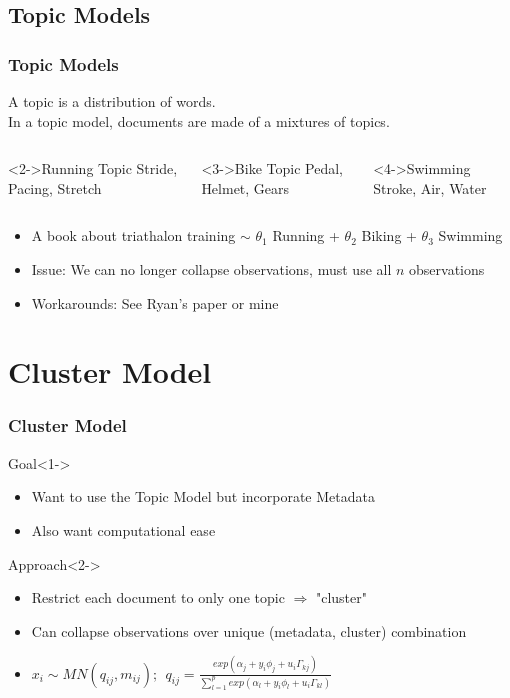 \documentclass[presentation]{beamer}
\begin{document}
\subsection{Topic Models}
\begin{frame}
 \frametitle{Topic Models}
A topic is a distribution of words. \\
In a topic model, documents are made of a mixtures of topics. 
\begin{columns}
\begin{block}<2->{Running Topic}
Stride, Pacing, Stretch
\end{block}
\begin{block}<3->{Bike Topic}
Pedal, Helmet, Gears
\end{block}
\begin{block}<4->{Swimming}
Stroke, Air, Water
\end{block}
\end{columns}
\begin{itemize}
\item<5-> A book about triathalon training $\sim$ $\theta_1$ Running + $\theta_2$ Biking + $\theta_3$ Swimming
\item<6-> Issue: We can no longer collapse observations, must use all $n$ observations
\item <7-> Workarounds: See Ryan's paper\footnotemark {}
or mine \footnotemark {}
\end{itemize}
\end{frame}

\section{Cluster Model}
\begin{frame}
 \frametitle{Cluster Model}
\begin{block}{Goal}<1->
\begin{itemize}
\item Want to use the Topic Model but incorporate Metadata
\item Also want computational ease
\end{itemize}
\end{block}
\begin{block}{Approach}<2->
\begin{itemize}
\item Restrict each document to only one topic $\Rightarrow$ "cluster"
\item Can collapse observations over unique (metadata, cluster) combination
\item $ x_{i} \sim MN(q_{ij},m_{ij})    ; ~~  q_{ij} = \frac{exp(\alpha_j + y_i \phi_j + u_i \Gamma_{kj})}{\sum_{l=1}^{p}{exp(\alpha_l+ y_i \phi_l + u_i \Gamma_{kl})}} $
\end{itemize}
\end{block}
\end{frame}
\end{document}
